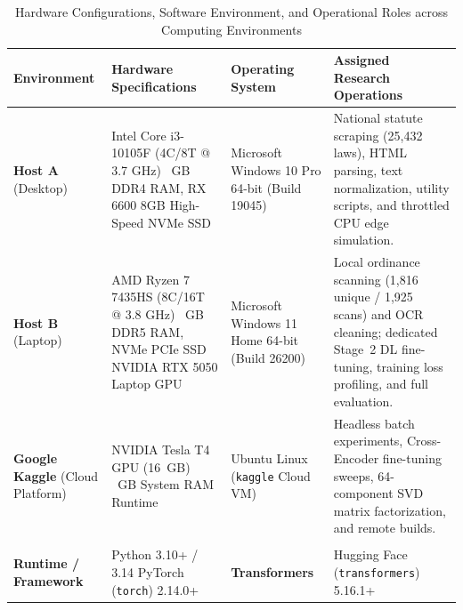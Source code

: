     \begin{table}[!htbp]
        \centering
        \footnotesize
        \renewcommand{\arraystretch}{0.92}
        \setlength{\tabcolsep}{3.0pt}
        \caption[Hardware Configurations and Operational Roles across Computing Environments]{Hardware Configurations, Software Environment, and Operational Roles across Computing Environments}
        \label{tab:system_environment_specs}
        \begin{tabularx}{\linewidth}{>{\RaggedRight}p{2.4cm}>{\RaggedRight}p{3.9cm}>{\RaggedRight}p{2.8cm}>{\RaggedRight}X}
            \toprule
            \textbf{Environment} & \textbf{Hardware Specifications} & \textbf{Operating System} & \textbf{Assigned Research Operations} \\
            \midrule
            \textbf{Host A} \newline (Desktop) & Intel Core i3-10105F (4C/8T @ 3.7 GHz) \newline 8~GB DDR4 RAM, RX 6600 8GB \newline High-Speed NVMe SSD & Microsoft Windows 10 Pro 64-bit (Build 19045) & National statute scraping (25,432 laws), HTML parsing, text normalization, utility scripts, and throttled CPU edge simulation. \\
            \addlinespace[2pt]
            \textbf{Host B} \newline (Laptop) & AMD Ryzen 7 7435HS (8C/16T @ 3.8 GHz) \newline 16~GB DDR5 RAM, NVMe PCIe SSD \newline NVIDIA RTX 5050 Laptop GPU & Microsoft Windows 11 Home 64-bit (Build 26200) & Local ordinance scanning (1,816 unique / 1,925 scans) and OCR cleaning; dedicated Stage~2 DL fine-tuning, training loss profiling, and full evaluation. \\
            \addlinespace[2pt]
            \textbf{Google Kaggle} \newline (Cloud Platform) & NVIDIA Tesla T4 GPU (16~GB) \newline 30~GB System RAM Runtime & Ubuntu Linux \newline (\texttt{kaggle} Cloud VM) & Headless batch experiments, Cross-Encoder fine-tuning sweeps, 64-component SVD matrix factorization, and remote builds. \\
            \midrule
            \multicolumn{4}{l}{\textbf{Standardized Software Stack and Execution Libraries}} \\
            \midrule
            \textbf{Runtime / Framework} & Python 3.10+ / 3.14 \newline PyTorch (\texttt{torch}) 2.14.0+ & \textbf{Transformers} & Hugging Face (\texttt{transformers}) 5.16.1+ \\

\end{tabularx}
\end{table}
